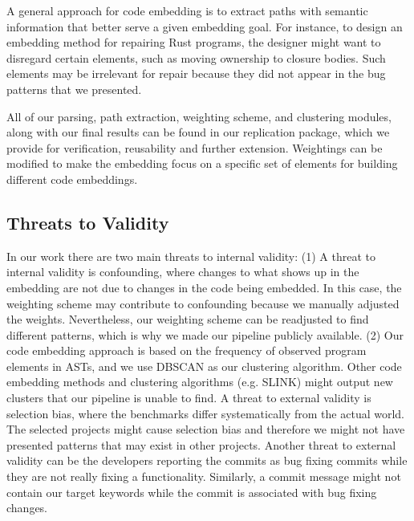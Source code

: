 A general approach for code embedding is to extract paths with semantic information that better serve a given embedding goal. For instance, to design an embedding method for repairing Rust programs, the designer might want to disregard certain elements, such as moving ownership to closure bodies. Such elements may be irrelevant for repair because they did not appear in the bug patterns that we presented.

All of our parsing, path extraction, weighting scheme, and clustering modules, along with our final results can be found in our replication package, which we provide for verification, reusability and further extension. Weightings can be modified to make the embedding focus on a specific set of elements for building different code embeddings.

\subsection{Threats to Validity}

In our work there are two main threats to internal validity: (1) A threat to internal validity is confounding, where changes to what shows up in the embedding are not due to changes in the code being embedded. In this case, the weighting scheme may contribute to confounding because we manually adjusted the weights. Nevertheless, our weighting scheme can be readjusted to find different patterns, which is why we made our pipeline publicly available. (2) Our code embedding approach is based on the frequency of observed program elements in ASTs, and we use DBSCAN as our clustering algorithm. Other code embedding methods and clustering algorithms (e.g. SLINK) might output new clusters that our pipeline is unable to find. A threat to external validity is selection bias, where the benchmarks differ systematically from the actual world. The selected projects might cause selection bias and therefore we might not have presented patterns that may exist in other projects. Another threat to external validity can be the developers reporting the commits as bug fixing commits while they are not really fixing a functionality. Similarly, a commit message might not contain our target keywords while the commit is associated with bug fixing changes.

